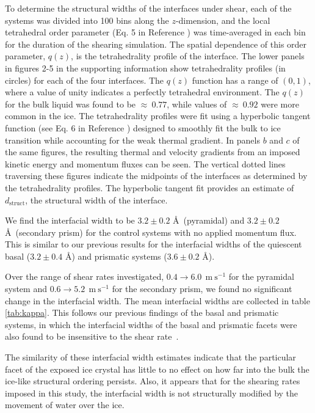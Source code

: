 To determine the structural widths of the interfaces under shear, each
of the systems was divided into 100 bins along the $z$-dimension, and
the local tetrahedral order parameter (Eq. 5 in Reference
\citealp{Louden13a}) was time-averaged in each bin for the duration of
the shearing simulation.  The spatial dependence of this order
parameter, $q(z)$, is the tetrahedrality profile of the interface.
The lower panels in figures 2-5 in the supporting information show
tetrahedrality profiles (in circles) for each of the four interfaces.
The $q(z)$ function has a range of $(0,1)$, where a value of unity
indicates a perfectly tetrahedral environment.  The $q(z)$ for the
bulk liquid was found to be $\approx~0.77$, while values of
$\approx~0.92$ were more common in the ice. The tetrahedrality
profiles were fit using a hyperbolic tangent function (see Eq. 6 in
Reference \citealp{Louden13a}) designed to smoothly fit the bulk to ice
transition while accounting for the weak thermal gradient. In panels
$b$ and $c$ of the same figures, the resulting thermal and velocity
gradients from an imposed kinetic energy and momentum fluxes can be
seen. The vertical dotted lines traversing these figures indicate the
midpoints of the interfaces as determined by the tetrahedrality
profiles.  The hyperbolic tangent fit provides an estimate of
$d_\mathrm{struct}$, the structural width of the interface.
 
We find the interfacial width to be $3.2 \pm 0.2$ \AA\ (pyramidal) and
$3.2 \pm 0.2$ \AA\ (secondary prism) for the control systems with no
applied momentum flux. This is similar to our previous results for the
interfacial widths of the quiescent basal ($3.2 \pm 0.4$ \AA) and
prismatic systems ($3.6 \pm 0.2$ \AA).

Over the range of shear rates investigated, $0.4 \rightarrow
6.0~\mathrm{~m~s}^{-1}$ for the pyramidal system and $0.6 \rightarrow
5.2~\mathrm{~m~s}^{-1}$ for the secondary prism, we found no
significant change in the interfacial width. The mean interfacial
widths are collected in table \ref{tab:kappa}. This follows our
previous findings of the basal and prismatic systems, in which the
interfacial widths of the basal and prismatic facets were also found
to be insensitive to the shear rate~\cite{Louden2013a}.

The similarity of these interfacial width estimates indicate that the
particular facet of the exposed ice crystal has little to no effect on
how far into the bulk the ice-like structural ordering persists. Also,
it appears that for the shearing rates imposed in this study, the
interfacial width is not structurally modified by the movement of
water over the ice.


